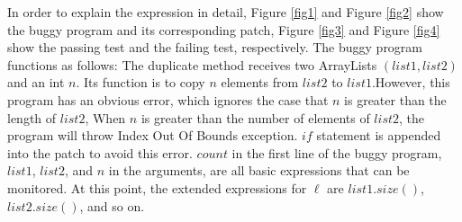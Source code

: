 In order to explain the expression in detail, Figure \ref{fig1} and Figure \ref{fig2} show the buggy program and its corresponding patch, Figure \ref{fig3} and Figure \ref{fig4} show the passing test and the failing test, respectively. The buggy program functions as follows: The duplicate method receives two ArrayLists $(list1,list2)$ and an int $n$. Its function is to copy $n$ elements from $list2$ to $list1$.However, this program has an obvious error, which ignores the case that $n$ is greater than the length of $list2$, When $n$ is greater than the number of elements of $list2$, the program will throw Index Out Of Bounds exception. $if$ statement is appended into the patch to avoid this error. $count$ in the first line of the buggy program, $list1$, $list2$, and $n$ in the arguments, are all basic expressions that can be monitored. At this point, the extended expressions for $\ell$ are $list1.size()$, $list2.size()$, and so on.
